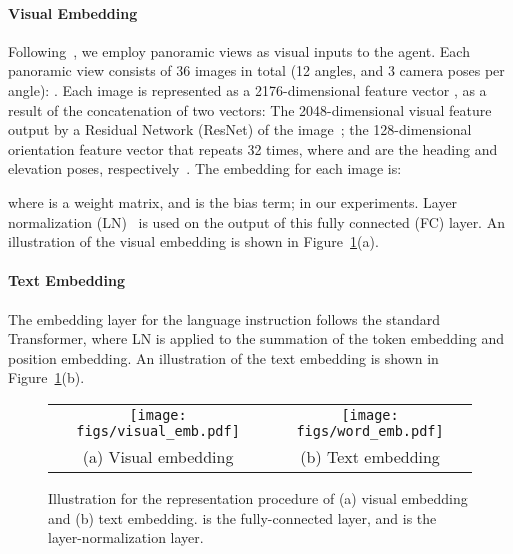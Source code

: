 \documentclass[10pt,twocolumn,letterpaper]{article}
\begin{document}
\paragraph{Visual Embedding} Following~\cite{fried2018speaker}, we employ panoramic views as visual inputs to the agent. Each panoramic view consists of 36 images in total (12 angles, and 3 camera poses per angle): . Each image is represented as a 2176-dimensional feature vector , as a result of the concatenation of two vectors: 
 The 2048-dimensional visual feature  output by a Residual Network (ResNet) of the image~\cite{he2016deep}; 
 the 128-dimensional orientation feature vector  that repeats  32 times, where  and  are the heading and elevation poses, respectively~\cite{fried2018speaker}. The embedding for each image is:  

where  is a weight matrix, and  is the bias term;  in our experiments. Layer normalization (LN)~\cite{ba2016layer} is used on the output of this fully connected (FC) layer. An illustration of the visual embedding is shown in Figure~\ref{fig:vision_lang_emb}(a).

\paragraph{Text Embedding} The embedding layer for the language instruction follows the standard Transformer, where LN is applied to the summation of the token embedding and position embedding.  An illustration of the text embedding is shown in Figure~\ref{fig:vision_lang_emb}(b).


\begin{figure}[t!]\vspace{-0mm}\centering
	\begin{tabular}{cc}
	    \hspace{-3mm}		
		\texttt{[image: figs/visual\_emb.pdf]} &
		 \hspace{3mm}		
		\texttt{[image: figs/word\_emb.pdf]}\\
		(a) Visual embedding &
		\hspace{3mm}		
		(b) Text embedding 
	\end{tabular}
	\vspace{-0mm}
	\caption{Illustration for the representation procedure of (a) visual embedding and (b) text embedding.  is the fully-connected layer, and  is the layer-normalization layer.}
	\vspace{-0mm}
	\label{fig:vision_lang_emb}
\end{figure}
\end{document}
